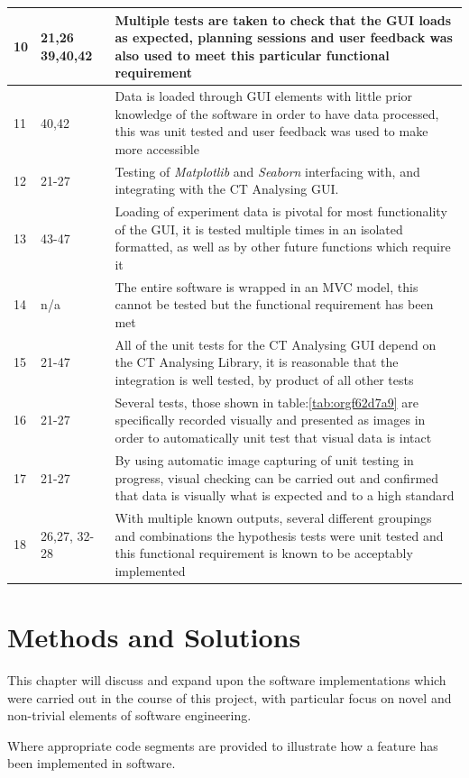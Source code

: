 \documentclass[11pt]{report}
\begin{document}
\begin{longtable}{|l|l|p{14cm}|}
\hline
10 & 21,26 39,40,42 & Multiple tests are taken to check that the GUI loads as expected, planning sessions and user feedback was also used to meet this particular functional requirement\\
\hline
11 & 40,42 & Data is loaded through GUI elements with little prior knowledge of the software in order to have data processed, this was unit tested and user feedback was used to make more accessible\\
\hline
12 & 21-27 & Testing of \emph{Matplotlib} and \emph{Seaborn} interfacing with, and integrating with the CT Analysing GUI.\\
\hline
13 & 43-47 & Loading of experiment data is pivotal for most functionality of the GUI, it is tested multiple times in an isolated formatted, as well as by other future functions which require it\\
\hline
14 & n/a & The entire software is wrapped in an MVC model, this cannot be tested but the functional requirement has been met\\
\hline
15 & 21-47 & All of the unit tests for the CT Analysing GUI depend on the CT Analysing Library, it is reasonable that the integration is well tested, by product of all other tests\\
\hline
16 & 21-27 & Several tests, those shown in table:\ref{tab:orgf62d7a9} are specifically recorded visually and presented as images in order to automatically unit test that visual data is intact\\
\hline
17 & 21-27 & By using automatic image capturing of unit testing in progress, visual checking can be carried out and confirmed that data is visually what is expected and to a high standard\\
\hline
18 & 26,27, 32-28 & With multiple known outputs, several different groupings and combinations the hypothesis tests were unit tested and this functional requirement is known to be acceptably implemented\\
\hline
\end{longtable}

\chapter{Methods and Solutions}
\label{sec:orga3da909}
This chapter will discuss and expand upon the software implementations which were carried out in the course of this project, with particular focus on novel and non-trivial elements of software engineering.

Where appropriate code segments are provided to illustrate how a feature has been implemented in software.
\end{document}
